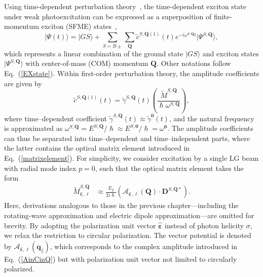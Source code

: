 Using time-dependent perturbation theory~\cite{griffiths2018introduction}, the time-dependent exciton state under weak photoexcitation can be expressed as a superposition of finite-momentum exciton (SFME) states~\cite{peng2022tailoring},
\begin{equation}
|\Psi(t)\rangle
=
|GS\rangle
+
\sum_{S=B\pm}
\sum_{\boldsymbol{Q}}
\tilde{c}^{S,\boldsymbol{Q}(1)}(t)
e^{-i\omega^{S,\boldsymbol{Q}} t}
|\Psi^{S,\boldsymbol{Q}}\rangle,
\label{exciton_state}
\end{equation}
which represents a linear combination of the ground state $|GS\rangle$ and exciton states $|\Psi^{S,\boldsymbol{Q}}\rangle$ with center-of-mass (COM) momentum $\boldsymbol{Q}$. Other notations follow Eq.~(\ref{EXstate}). Within first-order perturbation theory, the amplitude coefficients are given by
\begin{equation}
\tilde{c}^{S,\boldsymbol{Q}(1)}(t)
=
\tilde{\gamma}^{S,\boldsymbol{Q}}(t)
\left(
\frac{\tilde{M}^{S,\boldsymbol{Q}}}{\hslash\omega^{S,\boldsymbol{Q}}}
\right),
\label{time_coefficient}
\end{equation}
where time--dependent coefficient $\tilde{\gamma}^{S,\boldsymbol{Q}}(t)\approx \tilde{\gamma}^{\boldsymbol{0}}(t)$,
and the natural frequency is approximated as
$\omega^{S,\boldsymbol{Q}} = E^{S,\boldsymbol{Q}}/\hslash \approx E^{S,\boldsymbol{0}}/\hslash = \omega^{\boldsymbol{0}}$. The amplitude coefficients can thus be separated into time--dependent and time--independent parts, where the latter contains the optical matrix element introduced in Eq.~(\ref{matrixelement}). For simplicity, we consider excitation by a single LG beam with radial mode index $p=0$, such that the optical matrix element takes the form
\begin{align}
\tilde{M}_{\hat{\boldsymbol{\varepsilon}}, \ell}^{S,\boldsymbol{Q}}
&\approx
\frac{E_g}{2i\hslash}
\left(
\boldsymbol{\mathcal{A}}_{\hat{\boldsymbol{\varepsilon}},\ell}(\boldsymbol{Q})
\cdot
\boldsymbol{D}^{S,\boldsymbol{Q}*}
\right).
\label{matrixelement2}
\end{align}
Here, derivations analogous to those in the previous chapter---including the rotating-wave approximation and electric dipole approximation---are omitted for brevity. By adopting the polarization unit vector $\hat{\boldsymbol{\varepsilon}}$ instead of photon helicity $\sigma$, we relax the restriction to circular polarization. The vector potential is denoted by $\boldsymbol{\mathcal{A}}_{\hat{\boldsymbol{\varepsilon}}, \ell}(\boldsymbol{q}_\parallel)$, which corresponds to the complex amplitude introduced in Eq.~(\ref{AinCinQ}) but with polarization unit vector not limited to circularly polarized.


